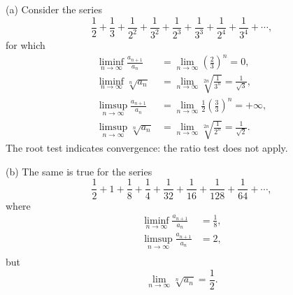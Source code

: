 \begin{myExample}
    \label{3.35}
    (a) Consider the series
    \begin{equation*}
        \frac{1}{2} 
        + \frac{1}{3}
        + \frac{1}{2^2}
        + \frac{1}{3^2}
        + \frac{1}{2^3}
        + \frac{1}{3^3}
        + \frac{1}{2^4}
        + \frac{1}{3^4}
        + \cdots,
    \end{equation*}
    for which
    \begin{align*}
        \liminf_{n \to \infty} \frac{a_{n+1}}{a_n} 
        &= \lim_{n \to \infty} \left(\frac{2}{3}\right)^n = 0,\\
        \liminf_{n \to \infty} \sqrt[n]{a_n} 
        &= \lim_{n \to \infty} \sqrt[2n]{\frac{1}{3^n}} = \frac{1}{\sqrt{3}},\\
        \limsup_{n \to \infty} \frac{a_{n+1}}{a_n} 
        &= \lim_{n \to \infty} \frac{1}{2}\left(\frac{3}{3}\right)^n = +\infty,\\
        \limsup_{n \to \infty} \sqrt[n]{a_n} 
        &= \lim_{n \to \infty} \sqrt[2n]{\frac{1}{2^n}} = \frac{1}{\sqrt{2}}.
    \end{align*}
    The root test indicates convergence: the ratio test does not apply.

    (b) The same is true for the series
    \begin{equation*}
        \frac{1}{2} + 1 
        + \frac{1}{8}
        + \frac{1}{4}
        + \frac{1}{32}
        + \frac{1}{16}
        + \frac{1}{128}
        + \frac{1}{64}
        +\cdots,
    \end{equation*}
    where
    \begin{align*}
        \liminf_{n \to \infty} \frac{a_{n+1}}{a_n} &= \frac{1}{8},\\
        \limsup_{n \to \infty} \frac{a_{n+1}}{a_n} &= 2,\\
    \end{align*}
    but 
    \begin{equation*}
        \lim_{n \to \infty} \sqrt[n]{a_n} = \frac{1}{2}.
    \end{equation*}
\end{myExample}
